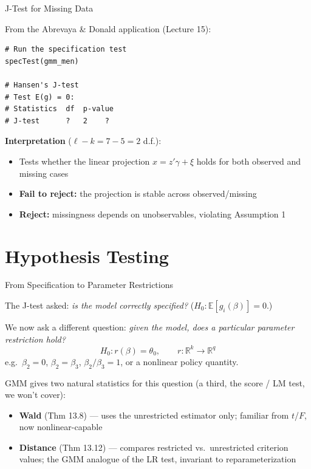 \documentclass[aspectratio=169, handout]{beamer}
\numberwithin{equation}{section}
\begin{document}
\begin{frame}[fragile]{J-Test for Missing Data}

From the Abrevaya \& Donald application (Lecture 15):

\begin{lstlisting}
# Run the specification test
specTest(gmm_men)

# Hansen's J-test
# Test E(g) = 0:
# Statistics  df  p-value
# J-test      ?   2    ?
\end{lstlisting}

\textbf{Interpretation} ($\ell - k = 7 - 5 = 2$ d.f.):
\begin{itemize}\itemsep=1pt
\item Tests whether the linear projection $x = z'\gamma + \xi$ holds for both observed and missing cases
\item \textbf{Fail to reject:} the projection is stable across observed/missing
\item \textbf{Reject:} missingness depends on unobservables, violating Assumption 1
\end{itemize}

\end{frame}

\section{Hypothesis Testing}

\begin{frame}{From Specification to Parameter Restrictions}

The J-test asked: \textit{is the model correctly specified?} ($H_0: \mathbb{E}[g_i(\beta)] = 0$.)

\medskip
We now ask a different question: \textit{given the model, does a particular parameter restriction hold?}
$$H_0: r(\beta) = \theta_0, \qquad r:\mathbb{R}^k\to\mathbb{R}^q$$
e.g.\ $\beta_2 = 0$, $\beta_2 = \beta_3$, $\beta_2/\beta_3 = 1$, or a nonlinear policy quantity.

\medskip
GMM gives two natural statistics for this question (a third, the score / LM test, we won't cover):
\begin{itemize}\itemsep=2pt
\item \textbf{Wald} (Thm 13.8) --- uses the unrestricted estimator only; familiar from $t$/$F$, now nonlinear-capable
\item \textbf{Distance} (Thm 13.12) --- compares restricted vs.\ unrestricted criterion values; the GMM analogue of the LR test, invariant to reparameterization
\end{itemize}

\end{frame}
\end{document}
